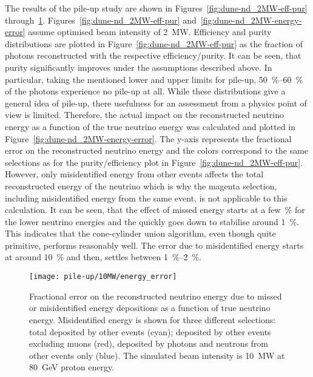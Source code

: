 The results of the pile-up study are shown in Figures~\ref{fig:dune-nd_2MW-eff-pur} through~\ref{fig:dune-nd_10MW-energy-error}.
Figures~\ref{fig:dune-nd_2MW-eff-pur} and~\ref{fig:dune-nd_2MW-energy-error} assume optimised beam intensity of \SI{2}{\mega\watt}.
Efficiency and purity distributions are plotted in Figure~\ref{fig:dune-nd_2MW-eff-pur} as the fraction of \Pgpz photons reconstructed with the respective efficiency/purity.
It can be seen, that purity significantly improves under the assumptions described above.
In particular, taking the mentioned lower and upper limits for pile-up, \SIrange{50}{60}{\percent} of the photons experience no pile-up at all.
While these distributions give a general idea of pile-up, there usefulness for an assessment from a physics point of view is limited.
Therefore, the actual impact on the reconstructed neutrino energy as a function of the true neutrino energy was calculated and plotted in Figure~\ref{fig:dune-nd_2MW-energy-error}.
The y-axis represents the fractional error on the reconstructed neutrino energy and the colors correspond to the same selections as for the purity/efficiency plot in Figure~\ref{fig:dune-nd_2MW-eff-pur}.
However, only misidentified energy from other events affects the total reconstructed energy of the neutrino which is why the magenta selection, including misidentified energy from the same event, is not applicable to this calculation.
It can be seen, that the effect of missed energy starts at a few~\si{\percent} for the lower neutrino energies and the quickly goes down to stabilise around \SI{1}{\percent}.
This indicates that the cone-cylinder union algorithm, even though quite primitive, performs reasonably well.
The error due to misidentified energy starts at around \SI{10}{\percent} and then, settles between \SIrange{1}{2}{\percent}.

\begin{figure}[htb]
	\centering
	\texttt{[image: pile-up/10MW/energy\_error]}
	\caption{Fractional error on the reconstructed neutrino energy due to missed or misidentified energy depositions as a function of true neutrino energy.
	Misidentified energy is shown for three different selections: total deposited by other events (cyan); deposited by other events excluding muons (red), deposited by photons and neutrons from other events only (blue).
	The simulated beam intensity is \SI{10}{\mega\watt} at \SI{80}{\giga\electronvolt} proton energy.}
	\label{fig:dune-nd_10MW-energy-error}
\end{figure}

